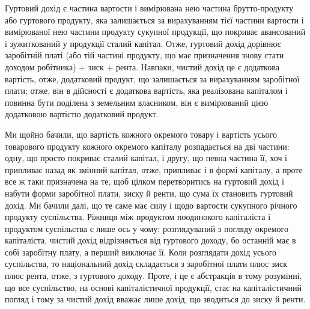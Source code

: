 Гуртовий дохід є частина вартости і вимірювана нею частина брутто-продукту
або гуртового продукту, яка залишається за вирахуванням тієї частини
вартости і вимірюваної нею частини продукту сукупної продукції, що покриває
авансований і зужиткований у продукції сталий капітал. Отже, гуртовий дохід
дорівнює заробітній платі (або тій частині продукту, що має призначення знову
стати доходом робітника) + зиск + рента. Навпаки, чистий дохід це є додаткова
вартість, отже, додатковий продукт, що залишається за вирахуванням заробітної
плати; отже, він в дійсності є додаткова вартість, яка реалізована капіталом і
повинна бути поділена з земельним власником, він є вимірюваний цією додатковою
вартістю додатковий продукт.

Ми щойно бачили, що вартість кожного окремого товару і вартість усього
товарового продукту кожного окремого капіталу розпадається на дві частини:
одну, що просто покриває сталий капітал, і другу, що певна частина її, хоч і
припливає назад як змінний капітал, отже, припливає і в формі капіталу,
а проте все ж таки призначена на те, щоб цілком перетворитись на гуртовий
дохід і набути форми заробітної плати, зиску й ренти, що сума їх становить
гуртовий дохід. Ми бачили далі, що те саме має силу і щодо вартости сукупного
річного продукту суспільства. Ріжниця між продуктом поодинокого капіталіста
і продуктом суспільства є лише ось у чому: розглядуваний з погляду
окремого капіталіста, чистий дохід відрізняється від гуртового доходу, бо останній
має в собі заробітну плату, а перший виключає її. Коли розглядати дохід
усього суспільства, то національний дохід складається з заробітної плати плюс
зиск плюс рента, отже, з гуртового доходу. Проте, і це є абстракція в тому
розумінні, що все суспільство, на основі капіталістичної продукції, стає на капіталістичний
погляд і тому за чистий дохід вважає лише дохід, що зводиться
до зиску й ренти.

